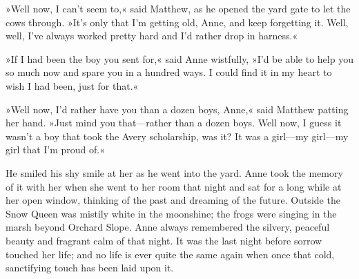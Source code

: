 »Well now, I can’t seem to,« said Matthew, as he opened the yard gate to let the cows through. »It’s only that I’m getting old, Anne, and keep forgetting it. Well, well, I’ve always worked pretty hard and I’d rather drop in harness.«

»If I had been the boy you sent for,« said Anne wistfully, »I’d be able to help you so much now and spare you in a hundred ways. I could find it in my heart to wish I had been, just for that.«

»Well now, I’d rather have you than a dozen boys, Anne,« said Matthew patting her hand. »Just mind you that—rather than a dozen boys. Well now, I guess it wasn’t a boy that took the Avery scholarship, was it? It was a girl—my girl—my girl that I’m proud of.«

He smiled his shy smile at her as he went into the yard. Anne took the memory of it with her when she went to her room that night and sat for a long while at her open window, thinking of the past and dreaming of the future. Outside the Snow Queen was mistily white in the moonshine; the frogs were singing in the marsh beyond Orchard Slope. Anne always remembered the silvery, peaceful beauty and fragrant calm of that night. It was the last night before sorrow touched her life; and no life is ever quite the same again when once that cold, sanctifying touch has been laid upon it.